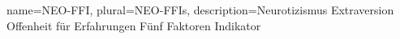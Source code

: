 
{
	name={NEO-FFI}, %
	plural={NEO-FFIs}, %
	description={Neurotizismus Extraversion Offenheit für Erfahrungen Fünf Faktoren Indikator} %
}


